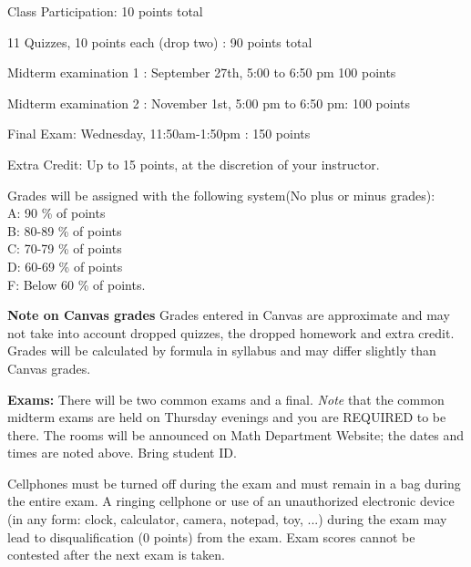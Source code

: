 \documentclass[11pt]{article}
\begin{document}
Class Participation: 10 points total

11 Quizzes, 10 points each (drop two) : 90 points total

Midterm examination 1 : September 27th, 5:00 to 6:50 pm 100 points 

Midterm examination 2 : November 1st, 5:00 pm to 6:50 pm: 100 points

Final Exam:  Wednesday, 11:50am-1:50pm : 150 points

Extra Credit: Up to 15 points, at the discretion of your instructor.

\vspace{1cm} 

\noindent Grades will be assigned with the following system(No plus or minus grades): \\
A: 90 \% of points\\
B: 80-89 \% of points\\
C:  70-79 \% of points\\
D: 60-69  \% of points\\
F: Below 60 \% of points. \\
\vspace{4mm}

\textbf{Note on Canvas grades} Grades entered in Canvas are approximate and may not take into account dropped quizzes, the dropped homework and extra credit. Grades will be calculated by formula in syllabus and may differ slightly than Canvas grades. 


\vspace{4mm}

\textbf{Exams:} There will be two common exams and a final.    \textit{Note} that the common midterm exams are held on Thursday evenings and you are REQUIRED to be there.  The rooms will be announced on Math Department Website; the dates and times are noted above. Bring student ID.

Cellphones must be turned off during the exam and must remain in a bag during the entire exam. A ringing cellphone or use of an unauthorized electronic device (in any form: clock, calculator, camera, notepad, toy, ...) during the exam may lead to disqualification (0 points) from the exam. Exam scores cannot be contested after the next exam is taken.
\end{document}
